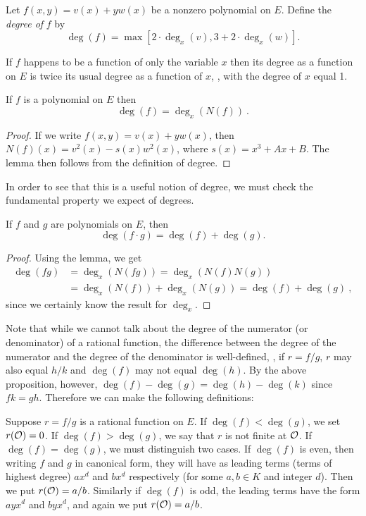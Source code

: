 \begin{defi}
\label{d3.6}
Let $f(x, y)=v(x)+yw(x)$ be a nonzero polynomial on $E$. Define the {\it degree of} $f$ by
\begin{equation}
\label{eq1.2}
\deg(f)=\max[2\cdot\deg_{x}(v),3+2\cdot\deg_{x}(w)].
\end{equation}
\end{defi}

If $f$ happens to be a function of only the variable $x$ then its degree as a function on $E$ is twice its usual degree as a function of $x$, \ie, with the degree of $x$ equal 1.

\begin{lem}
\label{l3.7}
If $f$ is a polynomial on $E$ then
$$
\deg(f)=\deg_{x}(N(f))\ .
$$
\end{lem}

\begin{proof}
If we write $f(x,y)=v(x)+yw(x)$, then $N(f)(x)=v^{2}(x)-s(x)w^{2}(x)$, where $s(x)=x^{3}+Ax+B$. The lemma then follows from the definition of degree.
\end{proof}

In order to see that this is a useful notion of degree, we must check the fundamental property we expect of degrees.

\begin{prop}
\label{p3.8}
If $f$ and $g$ are polynomials on $E$, then
\[\deg(f\cdot g)=\deg(f)+\deg(g).\]
\end{prop}

\begin{proof}
Using the lemma, we get
\begin{align*}
\deg(fg)&=\deg_{x}(N(fg))=\deg_{x}(N(f)N(g)) \\
&=\deg_{x}(N(f))+\deg_{x}(N(g))=\deg(f)+\deg(g)\ ,
\end{align*}
since we certainly know the result for $\deg_{x}$.
\end{proof}

Note that while we cannot talk about the degree of the numerator (or denominator) of a rational function, the difference between the degree of the numerator and the degree of the denominator is well-defined, \ie, if $r=f/g$, $r$ may also equal $h/k$ and $\deg(f)$ may not equal $\deg(h)$. By the above proposition, however, $\deg(f)-\deg(g)=\deg(h)-\deg(k)$ since $fk=gh$. Therefore we can make the following definitions:

\begin{defi}
\label{d3.9}
Suppose $r=f/g$ is a rational function on $E$. If $\deg(f)< \deg(g)$, we set $r(\mathcal{O})=0$. If $\deg(f)>\deg(g)$, we say that $r$ is not finite at $\mathcal{O}$. If $\deg(f)=\deg(g)$, we must distinguish two cases. If $\deg(f)$ is even, then writing $f$ and $g$ in canonical form, they will have as leading terms (terms of highest degree) $ax^{d}$ and $bx^{d}$ respectively (for some $a,b\in K$ and integer $d$). Then we put $r(\mathcal{O})=a/b$. Similarly if $\deg(f)$ is odd, the leading terms have the form $ayx^{d}$ and $byx^{d}$, and again we put $r(\mathcal{O})=a/b$.
\end{defi}

